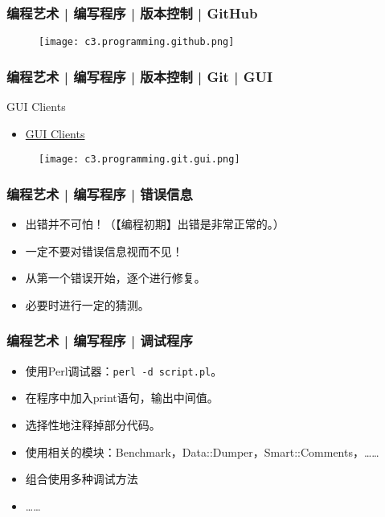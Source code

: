 \begin{frame}
  \frametitle{编程艺术 | 编写程序 | 版本控制 | GitHub}
  \begin{figure}
    \centering
    \texttt{[image: c3.programming.github.png]}
  \end{figure}
\end{frame}

\begin{frame}
  \frametitle{编程艺术 | 编写程序 | 版本控制 | Git | GUI}
  \begin{block}{GUI Clients}
    \begin{itemize}
      \item \href{https://git-scm.com/downloads/guis}{GUI Clients}
    \end{itemize}
  \end{block}
  \begin{figure}
    \centering
    \texttt{[image: c3.programming.git.gui.png]}
  \end{figure}
\end{frame}

\begin{frame}
  \frametitle{编程艺术 | 编写程序 | 错误信息}
  \begin{itemize}
    \item 出错并不可怕！（【编程初期】出错是非常正常的。）
    \item 一定不要对错误信息视而不见！
    \item 从第一个错误开始，逐个进行修复。
    \item 必要时进行一定的猜测。
  \end{itemize}
\end{frame}

\begin{frame}[fragile]
  \frametitle{编程艺术 | 编写程序 | \alert{调试程序}}
  \begin{itemize}
    \item 使用Perl调试器：\verb|perl -d script.pl|。
    \item 在程序中加入print语句，输出中间值。
    \item 选择性地注释掉部分代码。
    \item 使用相关的模块：Benchmark，Data::Dumper，Smart::Comments，……
    \item 组合使用多种调试方法
    \item ……
  \end{itemize}
\end{frame}

